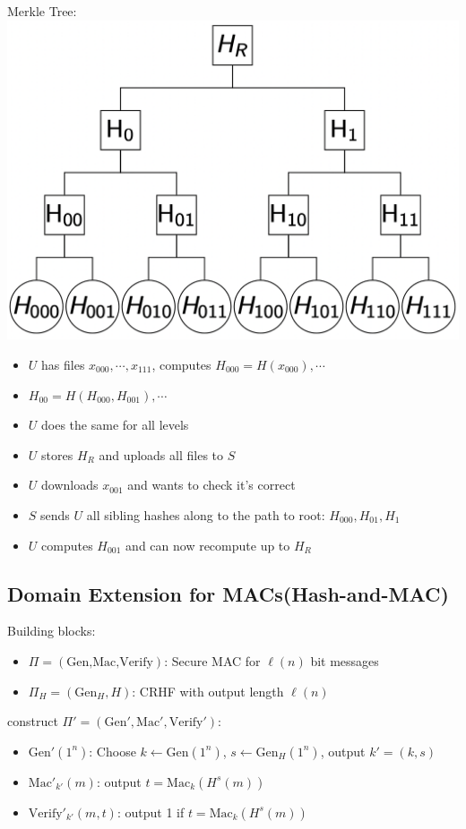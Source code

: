 Merkle Tree:\\
\includegraphics[width=\columnwidth]{Merkle Tree.png}
\begin{itemize}
    \item $U$ has files $x_{000},\cdots,x_{111}$, computes $H_{000}=H(x_{000}),\cdots$
    \item $H_{00}=H(H_{000},H_{001}), \cdots$
    \item $U$ does the same for all levels
    \item $U$ stores $H_R$ and uploads all files to $S$
    \item $U$ downloads $x_{001}$ and wants to check it's correct
    \item $S$ sends $U$ all sibling hashes along to the path to root:
    $H_{000},H_{01},H_1$
    \item $U$ computes $H_{001}$ and can now recompute up to $H_R$
\end{itemize}

\subsection*{Domain Extension for MACs(Hash-and-MAC)}
Building blocks:
\begin{itemize}
    \item $\Pi=(\text{Gen,Mac,Verify})$: Secure MAC for $\ell(n)$ bit messages
    \item $\Pi_H=(\text{Gen}_H,H)$: CRHF with output length $\ell(n)$
\end{itemize}
construct $\Pi'=(\text{Gen}',\text{Mac}',\text{Verify}')$:
\begin{itemize}
    \item $\text{Gen}'(1^n)$: Choose $k\leftarrow \text{Gen}(1^n)$,
    $s\leftarrow \text{Gen}_H(1^n)$, output $k'=(k,s)$
    \item $\text{Mac}'_{k'}(m)$: output $t=\text{Mac}_k(H^s(m))$
    \item $\text{Verify}'_{k'}(m,t)$: output 1 if $t=\text{Mac}_k(H^s(m))$
\end{itemize}

